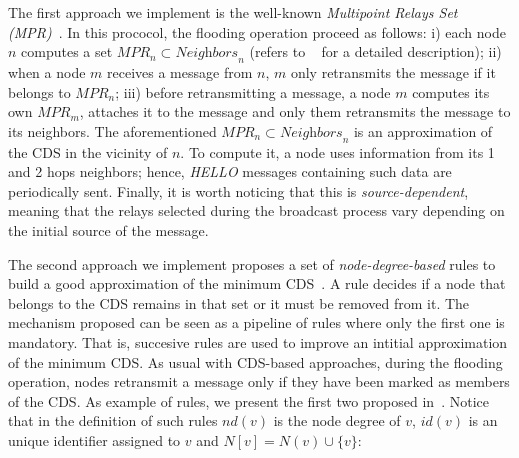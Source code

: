 The first approach we implement is the well-known \textit{Multipoint Relays Set (MPR)}~\cite{Qayyum2002}.
In this prococol, the flooding operation proceed as follows: i) each node $n$ computes a set $\textit{MPR}_n \subset \textit{Neighbors}_n$ (refers to ~\cite{Qayyum2002} for a detailed description); ii) when a node $m$ receives a message from $n$, $m$ only retransmits the message if it belongs to $\textit{MPR}_n$; iii) before retransmitting a message, a node $m$ computes its own $\textit{MPR}_m$, attaches it to the message and only them retransmits the message to its neighbors.
The aforementioned $\textit{MPR}_n \subset \textit{Neighbors}_n$ is an approximation of the CDS in the vicinity of $n$.
To compute it, a node uses information from its 1 and 2 hops neighbors; hence, \textit{HELLO} messages containing such data are periodically sent.
Finally, it is worth noticing that this is \textit{source-dependent}, meaning that the relays selected during the broadcast process vary depending on the initial source of the message.




The second approach we implement proposes a set of \textit{node-degree-based} rules to build a good approximation of the minimum CDS~\cite{Wu2001}.
A rule decides if a node that belongs to the CDS remains in that set or it must be removed from it.  
The mechanism proposed can be seen as a pipeline of rules where only the first one is mandatory.
That is, succesive rules are used to improve an intitial approximation of the minimum CDS.
As usual with CDS-based approaches, during the flooding operation, nodes retransmit a message only if they have been marked as members of the CDS.
As example of rules, we present the first two proposed in~\cite{Wu2001}.
Notice that in the definition of such rules $\textit{nd}(v)$ is the node degree of $v$, $\textit{id}(v)$ is an unique identifier assigned to $v$ and $N\left[v\right] = N(v) \cup \lbrace v \rbrace$:

